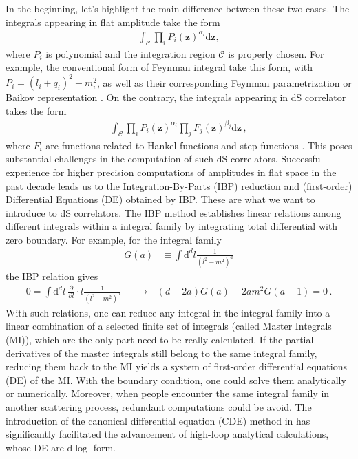 \documentclass[a4paper,11pt]{article}
\newcommand{\nd}{\mathrm{d}}
\newcommand{\bea}{\begin{eqnarray}}
\newcommand{\eea}{\end{eqnarray}}
\begin{document}
In the beginning, let's highlight the main difference between these two cases. The integrals appearing in flat amplitude take the form
\begin{align}
\int_\mathcal{C} \prod_i P_i(\bm{z})^{\alpha_i} \nd \bm{z},\label{eq:polyintegrand}
\end{align}
where $P_i$ is polynomial and the integration region $\mathcal{C}$ is  properly chosen. 
For example, the conventional form of Feynman integral take this form, with $P_i=(l_i+q_i)^2-m_i^2$, as well as their corresponding Feynman parametrization or Baikov representation \cite{Baikov:1996iu}. On the contrary, the integrals appearing in dS correlator takes the form
\begin{align}
\int_\mathcal{C} \prod_i P_i(\bm{z})^{\alpha_i} \prod_j F_j(\bm{z})^{\beta_j} \nd \bm{z}  \, , \label{eq:fintegrand}
\end{align}
where $F_i$ are functions related to Hankel functions and step functions \cite{Chen:2017ryl}.  This poses substantial challenges in the computation of such dS correlators. Successful experience for higher precision computations of amplitudes in flat space in the past decade leads us to the Integration-By-Parts (IBP) reduction \cite{Chetyrkin:1981qh} and (first-order) Differential Equations (DE) \cite{Kotikov:1990kg,Kotikov:1991pm,Gehrmann:1999as,Bern:1993kr}  obtained by IBP. These are what we want to introduce to dS correlators. The IBP method establishes linear relations among different integrals within a integral family by integrating total differential with zero boundary. For example, for the integral family
\bea
G(a) &\equiv \int \nd^d l  \frac{ 1 }{(l^2-m^2)^a} \eea
%
the IBP relation gives
%
\bea 
0=\int  \nd^d l ~ \frac{\partial}{\partial l}\cdot l \frac{ 1 }{(l^2-m^2)^a}  ~~~&\to ~~~ (d-2a)G(a)-2 a m^2 G(a+1)=0 \, . \label{eq:IBP} 
\eea
With such relations, one can reduce any integral in the integral family into a linear combination of a selected finite set of integrals (called Master Integrals (MI)), which are the only part need to be really calculated. If the partial derivatives of the master integrals still belong to the same integral family, reducing them back to the MI yields a system of first-order differential equations (DE) of the MI.  With the boundary condition, one could solve them analytically or numerically. Moreover, when people encounter the same integral family in another scattering process, redundant computations could be avoid. The introduction of the canonical differential equation (CDE) method in \cite{Henn:2013pwa} has significantly facilitated the advancement of high-loop analytical calculations, whose DE are $\nd \log$-form. 
\end{document}
